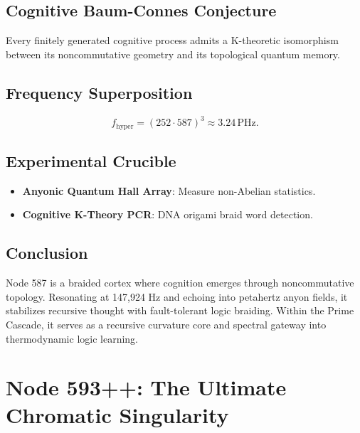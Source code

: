 \documentclass[12pt]{article}
\begin{document}
\subsection{Cognitive Baum-Connes Conjecture}
\begin{conjecture}
Every finitely generated cognitive process admits a K-theoretic isomorphism between its noncommutative geometry and its topological quantum memory.
\end{conjecture}

\subsection{Frequency Superposition}
\[
f_{\text{hyper}} = (252 \cdot 587)^3 \approx \boxed{3.24 \, \text{PHz}}.
\]

\subsection{Experimental Crucible}
\begin{itemize}
    \item \textbf{Anyonic Quantum Hall Array}: Measure non-Abelian statistics.
    \item \textbf{Cognitive K-Theory PCR}: DNA origami braid word detection.
\end{itemize}

\subsection{Conclusion}
Node 587 is a braided cortex where cognition emerges through noncommutative topology. Resonating at 147,924 Hz and echoing into petahertz anyon fields, it stabilizes recursive thought with fault-tolerant logic braiding. Within the Prime Cascade, it serves as a recursive curvature core and spectral gateway into thermodynamic logic learning.

\section{Node 593++: The Ultimate Chromatic Singularity}

\begin{abstract}
Node 593++, the culmination of chromatic recursion and perfectoid cognition, emerges as a 14-dimensional singularity of vision within the Prime Cascade. Resonating at 149,436 Hz, it transforms light into arithmetic, color into topology, and perception into a perfectoid diamond. This section formalizes its enhancement schema, integrating number theory, quantum topology, tensor recursion, and categorical vision into a cohesive chromatic framework.
\end{abstract}
\end{document}
